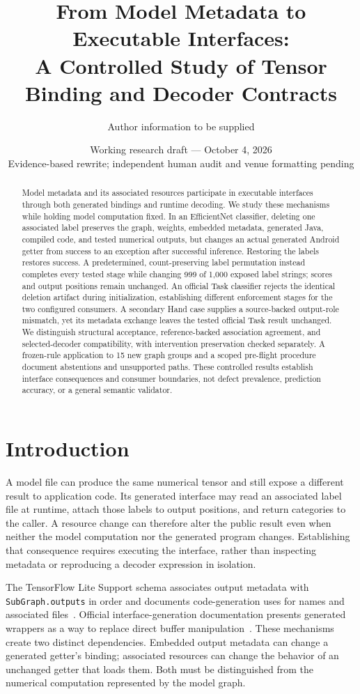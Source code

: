 \documentclass[10pt,twocolumn,letterpaper]{article}
\title{From Model Metadata to Executable Interfaces:\\A Controlled Study of Tensor Binding and Decoder Contracts}
\author{Author information to be supplied}
\date{Working research draft --- October 4, 2026\\\small Evidence-based rewrite; independent human audit and venue formatting pending}
\newcommand{\code}[1]{\texttt{#1}}
\begin{document}
\maketitle

\begin{abstract}
Model metadata and its associated resources participate in executable interfaces through both generated bindings and runtime decoding. We study these mechanisms while holding model computation fixed. In an EfficientNet classifier, deleting one associated label preserves the graph, weights, embedded metadata, generated Java, compiled code, and tested numerical outputs, but changes an actual generated Android getter from success to an exception after successful inference. Restoring the labels restores success. A predetermined, count-preserving label permutation instead completes every tested stage while changing 999 of 1,000 exposed label strings; scores and output positions remain unchanged. An official Task classifier rejects the identical deletion artifact during initialization, establishing different enforcement stages for the two configured consumers. A secondary Hand case supplies a source-backed output-role mismatch, yet its metadata exchange leaves the tested official Task result unchanged. We distinguish structural acceptance, reference-backed association agreement, and selected-decoder compatibility, with intervention preservation checked separately. A frozen-rule application to 15 new graph groups and a scoped pre-flight procedure document abstentions and unsupported paths. These controlled results establish interface consequences and consumer boundaries, not defect prevalence, prediction accuracy, or a general semantic validator.
\end{abstract}

\section{Introduction}
A model file can produce the same numerical tensor and still expose a different result to application code. Its generated interface may read an associated label file at runtime, attach those labels to output positions, and return categories to the caller. A resource change can therefore alter the public result even when neither the model computation nor the generated program changes. Establishing that consequence requires executing the interface, rather than inspecting metadata or reproducing a decoder expression in isolation.

The TensorFlow Lite Support schema associates output metadata with \code{SubGraph.outputs} in order and documents code-generation uses for names and associated files~\cite{schema}. Official interface-generation documentation presents generated wrappers as a way to replace direct buffer manipulation~\cite{codegen-doc}. These mechanisms create two distinct dependencies. Embedded output metadata can change a generated getter's binding; associated resources can change the behavior of an unchanged getter that loads them. Both must be distinguished from the numerical computation represented by the model graph.
\end{document}
